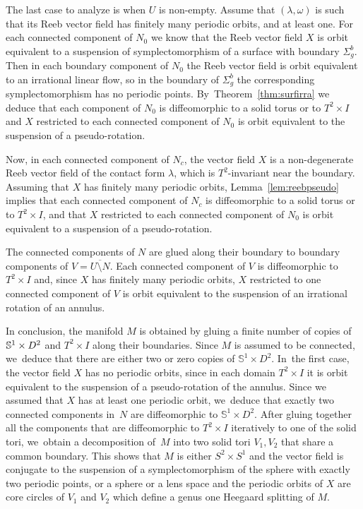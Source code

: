\documentclass[10pt]{amsart}
\theoremstyle{definition}
\newcommand{\mS}{\mathbb{S}}
\begin{document}
The last case to analyze is when $U$ is non-empty. Assume that $(\lambda,\omega)$ is such that its Reeb vector field has finitely many periodic orbits, and at least one. For each connected component of $N_0$ we know that the Reeb vector field $X$ is orbit equivalent to a suspension of symplectomorphism of a surface with boundary $\Sigma_g^b$. Then in each boundary component of $N_0$ the Reeb vector field is orbit equivalent to an irrational linear flow, so in the boundary of $\Sigma_g^b$ the corresponding symplectomorphism has no periodic points. By~Theorem~\ref{thm:surfirra} we deduce that each component of $N_0$ is diffeomorphic to a solid torus or to $T^2\times I$ and $X$ restricted to each connected component of $N_0$ is orbit equivalent to the suspension of a pseudo-rotation.

Now, in each connected component of $N_c$, the vector field $X$ is a non-degenerate Reeb vector field of the contact form $\lambda$, which is $T^2$-invariant near the boundary.
Assuming that $X$ has finitely many periodic orbits, Lemma~\ref{lem:reebpseudo} implies that each connected component of $N_c$ is diffeomorphic to a solid torus or to $T^2\times I$, and that $X$ restricted to each connected component of $N_0$ is orbit equivalent to a suspension of a pseudo-rotation.

The connected components of $N$ are glued along their boundary to boundary components of $V=\overline{U\setminus N}$. Each connected component of $V$ is diffeomorphic to $T^2\times I$ and, since $X$ has finitely many periodic orbits, $X$ restricted to one connected component of $V$ is orbit equivalent to the suspension of an irrational rotation of an annulus.

In conclusion, the manifold $M$ is obtained by gluing a finite number of copies of $\mS^1\times\nobreak D^2$ and $T^2\times I$ along their boundaries. Since $M$ is assumed to be connected, we~deduce that there are either two or zero copies of $\mS^1\times D^2$. In~the first case, the vector field $X$ has no periodic orbits, since in each domain $T^2\times I$ it is orbit equivalent to the suspension of a pseudo-rotation of the annulus. Since we assumed that $X$ has at least one periodic orbit, we~deduce that exactly two connected components in~$N$ are diffeomorphic to $\mS^1\times D^2$. After gluing together all the components that are diffeomorphic to $T^2\times I$ iteratively to one of the solid tori, we~obtain a decomposition of~$M$ into two solid tori $V_1, V_2$ that share a common boundary. This shows that $M$ is either $S^2\times S^1$ and the vector field is conjugate to the suspension of a symplectomorphism of the sphere with exactly two periodic points, or a sphere or a lens space and the periodic orbits of $X$ are core circles of $V_1$ and $V_2$ which define a genus one Heegaard splitting of $M$.
\end{document}
